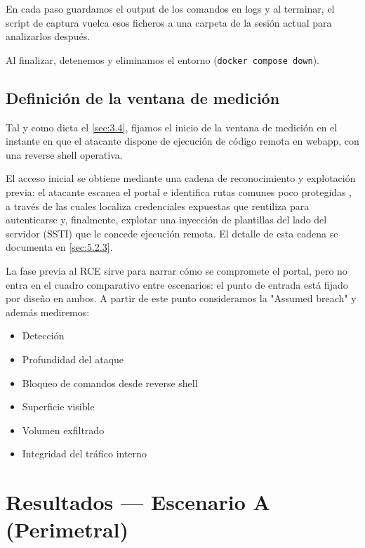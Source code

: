 \documentclass[11pt,spanish,listoffigures,listoftables]{tfgetsinf}
\begin{document}
        En cada paso guardamos el output de los comandos en logs y al terminar, el script de captura vuelca esos ficheros a una carpeta de la sesión actual para analizarlos después. 
        
        Al finalizar, detenemos y eliminamos el entorno (\texttt{docker compose down}).
        
        \subsection{Definición de la ventana de medición}
        \label{sec:6.1.3}

        Tal y como dicta el \cref{sec:3.4}, fijamos el inicio de la ventana de medición en el instante en que el atacante dispone de ejecución de código remota en webapp, con una reverse shell operativa. 

        El acceso inicial se obtiene mediante una cadena de reconocimiento y explotación previa: el atacante escanea el portal e identifica rutas comunes poco protegidas , a través de las cuales localiza credenciales expuestas que reutiliza para autenticarse y, finalmente, explotar una inyección de plantillas del lado del servidor (SSTI) que le concede ejecución remota. El detalle de esta cadena se documenta en \cref{sec:5.2.3}.
        
        La fase previa al RCE sirve para narrar cómo se compromete el portal, pero no entra en el cuadro comparativo entre escenarios: el punto de entrada está fijado por diseño en ambos. A partir de este punto consideramos la "Assumed breach" y además mediremos:
        \begin{itemize}
            \item Detección
            \item Profundidad del ataque
            \item Bloqueo de comandos desde reverse shell
            \item Superficie visible
            \item Volumen exfiltrado
            \item Integridad del tráfico interno
        \end{itemize}
        
    \section{Resultados — Escenario A (Perimetral)}
    \label{sec:6.2}
    
\end{document}
